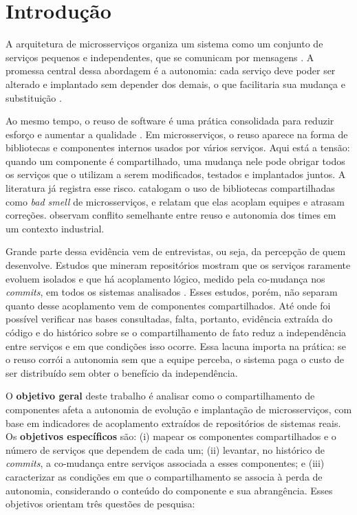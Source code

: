 \chapter{Introdução}
\label{cap:introducao}

A arquitetura de microsserviços organiza um sistema como um conjunto de serviços pequenos e independentes, que se comunicam por mensagens \cite{dragoni2017}. A promessa central dessa abordagem é a autonomia: cada serviço deve poder ser alterado e implantado sem depender dos demais, o que facilitaria sua mudança e substituição \cite{bogner2021}.

Ao mesmo tempo, o reuso de software é uma prática consolidada para reduzir esforço e aumentar a qualidade \cite{krueger1992,frakes2005}. Em microsserviços, o reuso aparece na forma de bibliotecas e componentes internos usados por vários serviços. Aqui está a tensão: quando um componente é compartilhado, uma mudança nele pode obrigar todos os serviços que o utilizam a serem modificados, testados e implantados juntos. A literatura já registra esse risco.  catalogam o uso de bibliotecas compartilhadas como \textit{bad smell} de microsserviços, e  relatam que elas acoplam equipes e atrasam correções.  observam conflito semelhante entre reuso e autonomia dos times em um contexto industrial.

Grande parte dessa evidência vem de entrevistas, ou seja, da percepção de quem desenvolve. Estudos que mineram repositórios mostram que os serviços raramente evoluem isolados \cite{assuncao2023} e que há acoplamento lógico, medido pela co-mudança nos \textit{commits}, em todos os sistemas analisados \cite{aragona2023}. Esses estudos, porém, não separam quanto desse acoplamento vem de componentes compartilhados. Até onde foi possível verificar nas bases consultadas, falta, portanto, evidência extraída do código e do histórico sobre se o compartilhamento de fato reduz a independência entre serviços e em que condições isso ocorre. Essa lacuna importa na prática: se o reuso corrói a autonomia sem que a equipe perceba, o sistema paga o custo de ser distribuído sem obter o benefício da independência.

O \textbf{objetivo geral} deste trabalho é analisar como o compartilhamento de componentes afeta a autonomia de evolução e implantação de microsserviços, com base em indicadores de acoplamento extraídos de repositórios de sistemas reais. Os \textbf{objetivos específicos} são: (i) mapear os componentes compartilhados e o número de serviços que dependem de cada um; (ii) levantar, no histórico de \textit{commits}, a co-mudança entre serviços associada a esses componentes; e (iii) caracterizar as condições em que o compartilhamento se associa à perda de autonomia, considerando o conteúdo do componente e sua abrangência. Esses objetivos orientam três questões de pesquisa:

